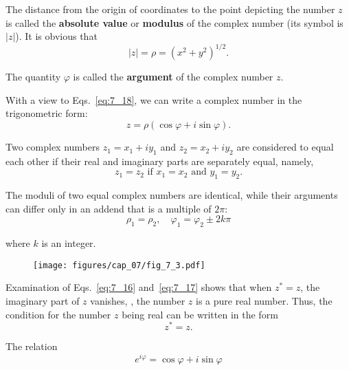 The distance from the origin of coordinates to the point depicting the number $z$ is called the \textbf{absolute value} or \textbf{modulus} of the complex number (its symbol is $|z|$). It is obvious that
\begin{equation}\label{eq:7_19}
	|z| = \rho = \left(x^2+y^2\right)^{1/2}.
\end{equation}

\noindent
The quantity $\varphi$ is called the \textbf{argument} of the complex number $z$.

With a view to Eqs.~\eqref{eq:7_18}, we can write a complex number in the trigonometric form:
\begin{equation}\label{eq:7_20}
	z = \rho(\cos\varphi + i\sin\varphi).
\end{equation}

Two complex numbers $z_1=x_1+iy_1$ and $z_2=x_2+iy_2$ are considered to equal each other if their real and imaginary parts are separately equal, namely,
\begin{equation}\label{eq:7_21}
	z_1 = z_2\,\, \text{if}\,\, x_1 = x_2\,\, \text{and}\,\, y_1 = y_2.
\end{equation}

\noindent
The moduli of two equal complex numbers are identical, while their arguments can differ only in an addend that is a multiple of $2\pi$:
\begin{equation}\label{eq:7_22}
	\rho_1 = \rho_2,\quad \varphi_1 = \varphi_2\pm 2k\pi
\end{equation}

\noindent
where $k$ is an integer.

\begin{figure}[t]
	\begin{center}
		\texttt{[image: figures/cap\_07/fig\_7\_3.pdf]}
		\caption[]{}
		\label{fig:7_3}
	\end{center}
	\vspace{-0.7cm}
\end{figure}

Examination of Eqs.~\eqref{eq:7_16} and~\eqref{eq:7_17} shows that when $z^*=z$, the imaginary part of $z$ vanishes, \ie, the number $z$ is a pure real number. Thus, the condition for the number $z$ being real can be written in the form
\begin{equation}\label{eq:7_23}
	z^* = z.
\end{equation}

The relation
\begin{equation}\label{eq:7_24}
	e^{i\varphi} = \cos\varphi + i\sin\varphi
\end{equation}

